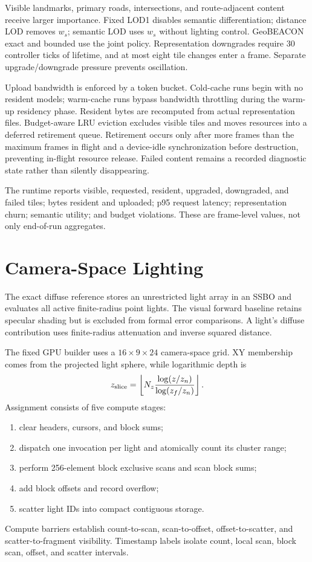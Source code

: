 \documentclass[10pt,twocolumn]{article}
\begin{document}
Visible landmarks, primary roads, intersections, and route-adjacent content receive larger
importance. Fixed LOD1 disables semantic differentiation; distance LOD removes $w_s$; semantic LOD
uses $w_s$ without lighting control. GeoBEACON exact and bounded use the joint policy. Representation
downgrades require 30 controller ticks of lifetime, and at most eight tile changes enter a frame.
Separate upgrade/downgrade pressure prevents oscillation.

Upload bandwidth is enforced by a token bucket. Cold-cache runs begin with no resident models;
warm-cache runs bypass bandwidth throttling during the warm-up residency phase. Resident bytes are
recomputed from actual representation files. Budget-aware LRU eviction excludes visible tiles and
moves resources into a deferred retirement queue. Retirement occurs only after more frames than the
maximum frames in flight and a device-idle synchronization before destruction, preventing
in-flight resource release. Failed content remains a recorded diagnostic state rather than
silently disappearing.

The runtime reports visible, requested, resident, upgraded, downgraded, and failed tiles; bytes
resident and uploaded; p95 request latency; representation churn; semantic utility; and budget
violations. These are frame-level values, not only end-of-run aggregates.

\clearpage
\section{Camera-Space Lighting}
The exact diffuse reference stores an unrestricted light array in an SSBO and evaluates all active
finite-radius point lights. The visual forward baseline retains specular shading but is excluded
from formal error comparisons. A light's diffuse contribution uses finite-radius attenuation and
inverse squared distance.

The fixed GPU builder uses a $16\times9\times24$ camera-space grid. XY membership comes from the
projected light sphere, while logarithmic depth is
\begin{equation}
z_{\rm slice}=\left\lfloor N_z
\frac{\log(z/z_n)}{\log(z_f/z_n)}\right\rfloor .
\end{equation}
Assignment consists of five compute stages:
\begin{enumerate}
  \item clear headers, cursors, and block sums;
  \item dispatch one invocation per light and atomically count its cluster range;
  \item perform 256-element block exclusive scans and scan block sums;
  \item add block offsets and record overflow;
  \item scatter light IDs into compact contiguous storage.
\end{enumerate}
Compute barriers establish count-to-scan, scan-to-offset, offset-to-scatter, and
scatter-to-fragment visibility. Timestamp labels isolate count, local scan, block scan, offset, and
scatter intervals.
\end{document}
